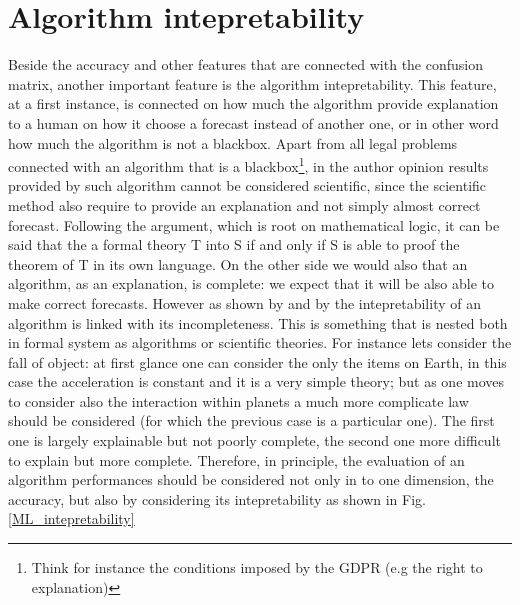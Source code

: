 \documentclass[12pt,%
               a4paper,%
               oneside,openany,%
               titlepage,%
               headinclude,footinclude,%
               BCOR5mm,%
               cleardoublepage=empty,%
               tablecaptionabove,%
               floatperchapter,
               ]{scrreprt}                 %
\begin{document}
\section{Algorithm intepretability}

Beside the accuracy and other features that are connected with the confusion matrix, another important feature is the algorithm intepretability. This feature, at a first instance, is connected on how much the algorithm provide explanation to a human on how it choose a forecast instead of another one, or in other word how much the algorithm is not a blackbox. Apart from all legal problems connected with an algorithm that is a blackbox\footnote{Think for instance the conditions imposed by the GDPR (e.g the right to explanation)}, in the author opinion results provided by such algorithm cannot be considered scientific, since the scientific method also require to provide an explanation and not simply almost correct forecast. Following the \cite{tarski1953undecidable} argument, which is root on mathematical logic, it can be said that the a formal theory T into S if and only if S is able to proof the theorem of T in its own language. On the other side we would also that an algorithm, as an explanation, is complete: we expect that it will be also able to make correct forecasts. However as shown by \cite{doshi2017towards} and by \cite{gilpin2018explaining}  the intepretability of an algorithm is linked with its incompleteness. This is something that is nested both in formal system as algorithms or scientific theories. For instance lets consider the fall of object: at first glance one can consider the only the items on Earth, in this case the acceleration is constant and it is a very simple theory; but as one moves to consider also the interaction within planets a much more complicate law should be considered (for which the previous case is a particular one). The first one is largely explainable but not poorly complete, the second one more difficult to explain but more complete. Therefore, in principle, the evaluation of an algorithm performances should be considered not only in to one dimension, the accuracy, but also by considering its intepretability as shown in Fig. \ref{ML_intepretability}
\end{document}
